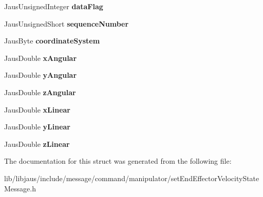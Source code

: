 \begin{DoxyCompactItemize}
\item 
\hypertarget{struct_set_end_effector_velocity_state_message_struct_ad5aede91873f5a927825449a9161da08}{\-Jaus\-Unsigned\-Integer {\bfseries data\-Flag}}\label{struct_set_end_effector_velocity_state_message_struct_ad5aede91873f5a927825449a9161da08}

\item 
\hypertarget{struct_set_end_effector_velocity_state_message_struct_a5756b1e52f3ef11768a404e801b17154}{\-Jaus\-Unsigned\-Short {\bfseries sequence\-Number}}\label{struct_set_end_effector_velocity_state_message_struct_a5756b1e52f3ef11768a404e801b17154}

\item 
\hypertarget{struct_set_end_effector_velocity_state_message_struct_a89c1efb5a00ffc359bfdb95787c8d96c}{\-Jaus\-Byte {\bfseries coordinate\-System}}\label{struct_set_end_effector_velocity_state_message_struct_a89c1efb5a00ffc359bfdb95787c8d96c}

\item 
\hypertarget{struct_set_end_effector_velocity_state_message_struct_ae8fd09ed6bcad3e29820f1fd726d4d41}{\-Jaus\-Double {\bfseries x\-Angular}}\label{struct_set_end_effector_velocity_state_message_struct_ae8fd09ed6bcad3e29820f1fd726d4d41}

\item 
\hypertarget{struct_set_end_effector_velocity_state_message_struct_a9537ddf82ecab2a61d42b06f6812bc29}{\-Jaus\-Double {\bfseries y\-Angular}}\label{struct_set_end_effector_velocity_state_message_struct_a9537ddf82ecab2a61d42b06f6812bc29}

\item 
\hypertarget{struct_set_end_effector_velocity_state_message_struct_ae4ae15010b6e8311c6a6eb3f2e5f8b9c}{\-Jaus\-Double {\bfseries z\-Angular}}\label{struct_set_end_effector_velocity_state_message_struct_ae4ae15010b6e8311c6a6eb3f2e5f8b9c}

\item 
\hypertarget{struct_set_end_effector_velocity_state_message_struct_a40cff2e37707507e613e095bd89293c0}{\-Jaus\-Double {\bfseries x\-Linear}}\label{struct_set_end_effector_velocity_state_message_struct_a40cff2e37707507e613e095bd89293c0}

\item 
\hypertarget{struct_set_end_effector_velocity_state_message_struct_a53abad5596e1b700e1f46d9a9cda5c9e}{\-Jaus\-Double {\bfseries y\-Linear}}\label{struct_set_end_effector_velocity_state_message_struct_a53abad5596e1b700e1f46d9a9cda5c9e}

\item 
\hypertarget{struct_set_end_effector_velocity_state_message_struct_a2b8474f3ced169449eac49ea54333300}{\-Jaus\-Double {\bfseries z\-Linear}}\label{struct_set_end_effector_velocity_state_message_struct_a2b8474f3ced169449eac49ea54333300}

\end{DoxyCompactItemize}


\-The documentation for this struct was generated from the following file\-:\begin{DoxyCompactItemize}
\item 
lib/libjaus/include/message/command/manipulator/set\-End\-Effector\-Velocity\-State\-Message.\-h\end{DoxyCompactItemize}
